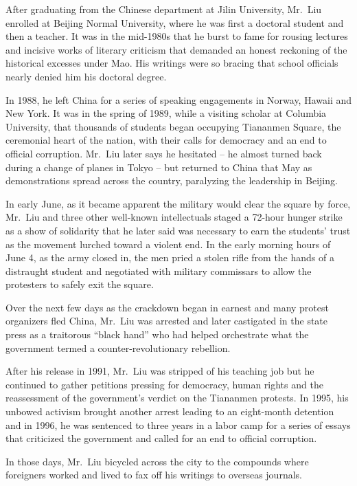 ﻿\documentclass[12pt]{article}
\begin{document}
After graduating from the Chinese department at Jilin University, Mr.~Liu enrolled at Beijing Normal
University, where he was first a doctoral student and then a teacher. It was in the mid-1980s that
he burst to fame for rousing lectures and incisive works of literary criticism that demanded an
honest reckoning of the historical excesses under Mao. His writings were so bracing that school
officials nearly denied him his doctoral degree.

In 1988, he left China for a series of speaking engagements in Norway, Hawaii and New York. It was
in the spring of 1989, while a visiting scholar at Columbia University, that thousands of students
began occupying Tiananmen Square, the ceremonial heart of the nation, with their calls for democracy
and an end to official corruption. Mr.~Liu later says he hesitated -- he almost turned back during a
change of planes in Tokyo -- but returned to China that May as demonstrations spread across the
country, paralyzing the leadership in Beijing.

In early June, as it became apparent the military would clear the square by force, Mr.~Liu and three
other well-known intellectuals staged a 72-hour hunger strike as a show of solidarity that he later
said was necessary to earn the students' trust as the movement lurched toward a violent end. In the
early morning hours of June 4, as the army closed in, the men pried a stolen rifle from the hands of
a distraught student and negotiated with military commissars to allow the protesters to safely exit
the square.

Over the next few days as the crackdown began in earnest and many protest organizers fled China,
Mr.~Liu was arrested and later castigated in the state press as a traitorous ``black hand'' who had
helped orchestrate what the government termed a counter-revolutionary rebellion.

After his release in 1991, Mr.~Liu was stripped of his teaching job but he continued to gather
petitions pressing for democracy, human rights and the reassessment of the government's verdict on
the Tiananmen protests. In 1995, his unbowed activism brought another arrest leading to an
eight-month detention and in 1996, he was sentenced to three years in a labor camp for a series of
essays that criticized the government and called for an end to official corruption.

In those days, Mr.~Liu bicycled across the city to the compounds where foreigners worked and lived
to fax off his writings to overseas journals.
\end{document}
